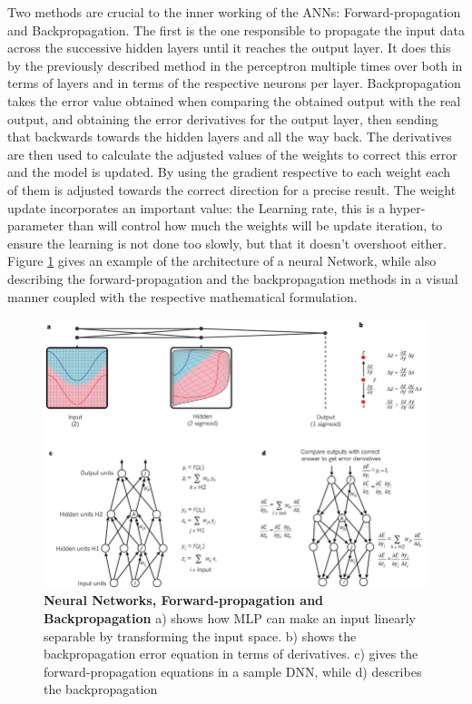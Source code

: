 Two methods are crucial to the inner working of the ANNs: Forward-propagation and Backpropagation. The first is the one responsible to propagate the input data across the successive hidden layers until it reaches the output layer. It does this by the previously described method in the perceptron multiple times over both in terms of layers and in terms of the respective neurons per layer. Backpropagation takes the error value obtained when comparing the obtained output with the real output, and obtaining the error derivatives for the output layer, then sending that backwards towards the hidden layers and all the way back. The derivatives are then used to calculate the adjusted values of the weights to correct this error and the model is updated. By using the gradient respective to each weight each of them is adjusted towards the correct direction for a precise result. The weight update incorporates an important value: the Learning rate, this is a hyper-parameter than will control how much the weights will be update iteration, to ensure the learning is not done too slowly, but that it doesn't overshoot either. Figure \ref{dnn1} gives an example of the architecture of a neural Network, while also describing the forward-propagation and the backpropagation methods in a visual manner coupled with the respective mathematical formulation.

\begin{figure}[!ht]
	\centerline{\includegraphics[width=5in]{images/background/deepnet.png}}
	\caption{{\bf Neural Networks, Forward-propagation and Backpropagation\cite{LeCun2015}} a) shows how MLP can make an input linearly separable by transforming the input space. b) shows the backpropagation error equation in terms of derivatives. c) gives the forward-propagation equations in a sample DNN, while d) describes the backpropagation } 
	\label{dnn1}
\end{figure}

